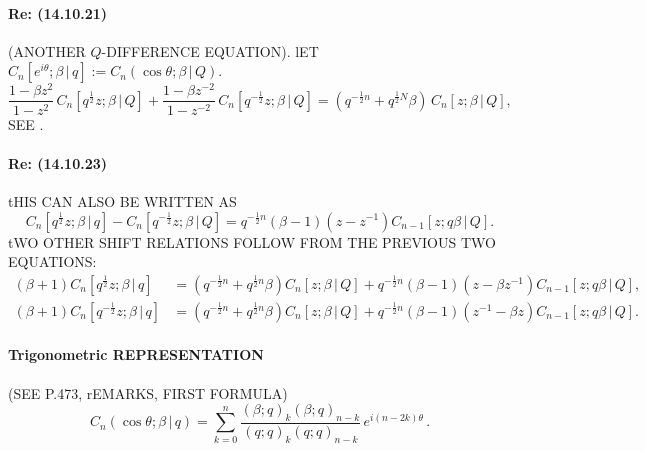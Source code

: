 \documentclass[twoside,11pt]{article}
\newcommand\be\beta
\newcommand\tha\theta
\newcommand\half{\frac12}
\begin{document}
\paragraph{Re: (14.10.21)} 
(ANOTHER $Q$-DIFFERENCE EQUATION). 
lET $C_n[e^{i\tha};\be\,|\, q]:=C_n(\cos\tha;\be\,|\, Q)$. 
\begin{equation} 
\frac{1-\be z^2}{1-z^2}\,C_n[q^\half z;\be\,|\, Q]+ 
\frac{1-\be z^{-2}}{1-z^{-2}}\,C_n[q^{-\half}z;\be\,|\, Q]= 
(q^{-\half n}+q^{\half N} \be)\,C_n[z;\be\,|\, Q], 
\label{24} 
\end{equation} 
SEE . 
% 
\paragraph{Re: (14.10.23)} 
tHIS CAN ALSO BE WRITTEN AS 
\begin{equation} 
C_n[q^\half z;\be\,|\, q]-C_n[q^{-\half}z;\be\,|\, Q]= 
q^{-\half n}(\be-1)(z-z^{-1})C_{n-1}[z;q\be\,|\, Q]. 
\label{25} 
\end{equation} 
tWO OTHER SHIFT RELATIONS FOLLOW FROM THE PREVIOUS TWO EQUATIONS: 
\begin{align} 
(\be+1)C_n[q^\half z;\be\,|\, q]&=(q^{-\half n}+q^{\half n}\be)C_n[z;\be\,|\, Q] 
+q^{-\half n}(\be-1)(z-\be z^{-1})C_{n-1}[z;q\be\,|\, Q], 
\label{26}\\ 
(\be+1)C_n[q^{-\half}z;\be\,|\, q]&=(q^{-\half n}+q^{\half n}\be)C_n[z;\be\,|\, Q] 
+q^{-\half n}(\be-1)(z^{-1}-\be z)C_{n-1}[z;q\be\,|\, Q]. 
\label{27} 
\end{align} 
% 
\paragraph{Trigonometric REPRESENTATION} 
(SEE P.473, rEMARKS, FIRST FORMULA) 
\begin{equation} 
C_n(\cos\tha;\be\,|\, q)=\sum_{k=0}^n 
\frac{(\be;q)_k (\be;q)_{n-k}}{(q;q)_k (q;q)_{n-k}}\,e^{i(n-2k)\tha}\,. 
\label{173} 
\end{equation} 
% 
\end{document}
